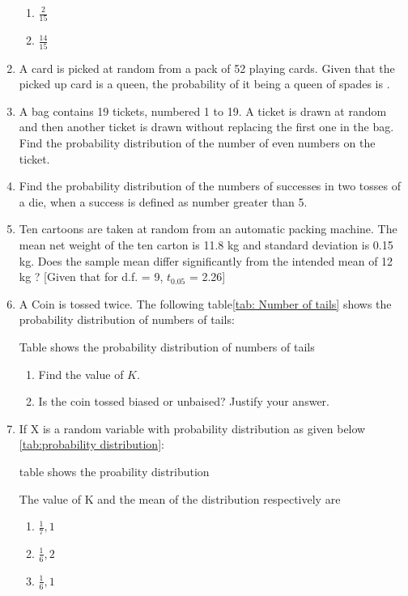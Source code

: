 \begin{enumerate}[label=\thesection.\arabic*.,ref=\thesection.\theenumi]
\begin{enumerate}
\item $\frac{2}{15}$
\item $\frac{14}{15}$
\end{enumerate}
\item A card is picked at random from a pack of 52 playing cards. Given that the picked up card is a queen, the probability of it being a queen of spades is \underline{\hspace{1cm}}.
\item A bag contains 19 tickets, numbered 1 to 19. A ticket is drawn at random and then another ticket is drawn without replacing the first one in the bag. Find the probability distribution of the number of even numbers on the ticket.
\item Find the probability distribution of the numbers of successes in two tosses of a die, when a success is defined as number greater than 5.
\item Ten cartoons are taken at random from an automatic packing machine. The mean net weight of the ten carton is 11.8 kg and standard deviation is 0.15 kg. Does the sample mean differ significantly from the intended mean of 12 kg ?
[Given that for d.f. = 9, $t_{0.05}$ = 2.26]
\item A Coin is tossed twice. The following table\ref{tab: Number of tails} shows the probability distribution of numbers of tails:
\begin{table}[!ht]
	
\caption{Table shows the probability distribution of numbers of tails \label{tab: Number of tails}}
\end{table}
\begin{enumerate}
\item Find the value of $K$.
\item Is the coin tossed biased or unbaised?
Justify your answer.
\end{enumerate}
\item If X is a random variable with probability distribution as given below \ref{tab:probability distribution}:
\begin{table}[!ht]

\caption{table shows the proability distribution \label{tab:probability distribution}}
\end{table}
\newline The value of K and the mean of the distribution respectively are 
\begin{enumerate}
\item $\frac{1}{7}, 1$
\item $\frac{1}{6}, 2$
\item $\frac{1}{6}, 1$

\end{enumerate}
\end{enumerate}

